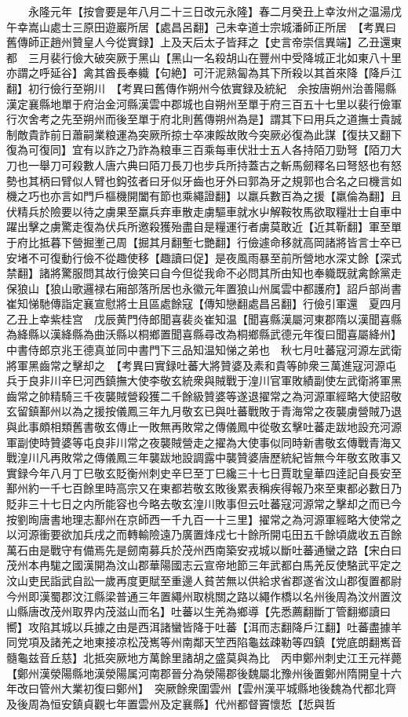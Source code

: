 　　永隆元年【按會要是年八月二十三日改元永隆】春二月癸丑上幸汝州之温湯戊午幸嵩山處士三原田遊巖所居【處昌呂翻】己未幸道士宗城潘師正所居　【考異曰舊傳師正趙州贊皇人今從實録】上及天后太子皆拜之【史言帝崇信異端】乙丑還東都　三月裴行儉大破突厥于黑山【黑山一名殺胡山在豐州中受降城正北如東八十里亦謂之呼延谷】禽其酋長奉軄【句絶】可汗泥熟匐為其下所殺以其首來降【降戶江翻】初行儉行至朔川　【考異曰舊傳作朔州今依實録及統紀　余按唐朔州治善陽縣漢定襄縣地單于府治金河縣漢雲中郡城也自朔州至單于府三百五十七里以裴行儉軍行次舍考之先至朔州而後至單于府北則舊傳朔州為是】謂其下曰用兵之道撫士貴誠制敵貴詐前日蕭嗣業粮運為突厥所掠士卒凍餒故敗今突厥必復為此謀【復扶又翻下復為可復同】宜有以詐之乃詐為粮車三百乘每車伏壯士五人各持陌刀勁弩【陌刀大刀也一舉刀可殺數人唐六典曰陌刀長刀也步兵所持蓋古之斬馬劒釋名曰弩怒也有怒勢也其柄曰臂似人臂也鈎弦者曰牙似牙齒也牙外曰郭為牙之規郭也合名之曰機言如機之巧也亦言如門戶樞機開闔有節也乘繩證翻】以羸兵數百為之援【羸倫為翻】且伏精兵於險要以待之虜果至羸兵弃車散走虜驅車就水屮解鞍牧馬欲取糧壯士自車中躍出擊之虜驚走復為伏兵所邀殺獲殆盡自是糧運行者虜莫敢近【近其靳翻】軍至單于府比抵暮下營掘壍己周【掘其月翻塹七艷翻】行儉遽命移就高岡諸將皆言士卒已安堵不可復動行儉不從趣使移【趣讀曰促】是夜風雨暴至前所營地水深丈餘【深式禁翻】諸將驚服問其故行儉笑曰自今但從我命不必問其所由知也奉軄既就禽餘黨走保狼山【狼山歌邏禄右廂部落所居也永徽元年置狼山州属雲中都護府】詔戶部尚書崔知悌馳傳詣定襄宣慰將士且區處餘寇【傳知戀翻處昌呂翻】行儉引軍還　夏四月乙丑上幸紫桂宫　戊辰黄門侍郎聞喜裴炎崔知温【聞喜縣漢屬河東郡隋以漢聞喜縣為絳縣以漢絳縣為曲沃縣以桐鄉置聞喜縣尋改為桐鄉縣武德元年復曰聞喜屬絳州】中書侍郎京兆王德真並同中書門下三品知温知悌之弟也　秋七月吐蕃寇河源左武衛將軍黑齒常之擊却之　【考異曰實録吐蕃大將贊婆及素和貴等帥衆三萬進寇河源屯兵于良非川辛巳河西鎮撫大使李敬玄統衆與賊戰于湟川官軍敗績副使左武衛將軍黑齒常之帥精騎三千夜襲賊營殺獲二千餘級贊婆等遂退擢常之為河源軍經略大使詔敬玄留鎮鄯州以為之援按儀鳳三年九月敬玄已與吐蕃戰敗于青海常之夜襲虜營賊乃退與此事頗相類舊書敬玄傳止一敗無再敗常之傳儀鳳中從敬玄擊吐蕃走跋地設充河源軍副使時贊婆等屯良非川常之夜襲賊營走之擢為大使事似同時新書敬玄傳戰青海又戰湟川凡再敗常之傳儀鳳三年襲跋地設調露中襲贊婆唐歷統紀皆無今年敬玄敗事又實録今年八月丁巳敬玄貶衡州刺史辛巳至丁巳纔三十七日賈耽皇華四逹記自長安至鄯州約一千七百餘里時高宗又在東都若敬玄敗後累表稱疾得報乃來至東都必數日乃貶非三十七日之内所能容也今略去敬玄湟川敗事但云吐蕃寇河源常之擊却之而已今按劉㫬唐書地理志鄯州在京師西一千九百一十三里】擢常之為河源軍經略大使常之以河源衝要欲加兵戌之而轉輸險遠乃廣置烽戍七十餘所開屯田五千餘頃歲收五百餘萬石由是戰守有備焉先是劒南募兵於茂州西南築安戎城以斷吐蕃通蠻之路【宋白曰茂州本冉駹之國漢開為汶山郡華陽國志云宣帝地節三年武都白馬羌反使駱武平定之汶山吏民詣武自訟一歲再度更賦至重邊人貧苦無以供給求省郡遂省汶山郡復置都尉今州即漢蜀郡汶江縣梁普通三年置繩州取桃關之路以繩作橋以名州後周為汶州置汶山縣唐改茂州取界内茂滋山而名】吐蕃以生羌為鄉導【先悉薦翻斷丁管翻鄉讀曰嚮】攻陷其城以兵據之由是西洱諸蠻皆降于吐蕃【洱而志翻降戶江翻】吐蕃盡據羊同党項及諸羌之地東接凉松茂嶲等州南鄰天笁西陷龜兹疎勒等四鎮【党底朗翻嶲音髓龜兹音丘慈】北抵突厥地方萬餘里諸胡之盛莫與為比　丙申鄭州刺史江王元祥薨【鄭州漢滎陽縣地漢滎陽属河南郡晉分為滎陽郡後魏屬北豫州後置鄭州隋開皇十六年改曰管州大業初復曰鄭州】　突厥餘衆圍雲州【雲州漢平城縣地後魏為代都北齊及後周為恒安鎮貞觀七年置雲州及定襄縣】代州都督竇懷悊【悊與哲